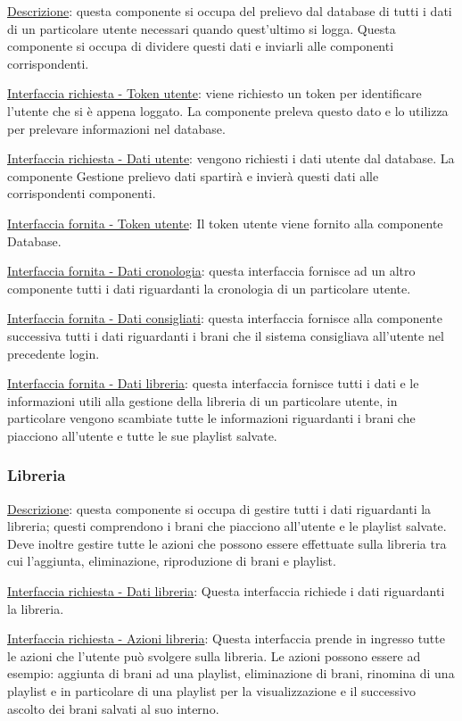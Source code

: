 \documentclass[a4paper,12pt]{article}
\begin{document}
\underline{Descrizione}: questa componente si occupa del prelievo dal database di tutti i dati di un particolare utente necessari quando quest’ultimo si logga. Questa componente si occupa di dividere questi dati e inviarli alle componenti corrispondenti.

\underline{Interfaccia richiesta - Token utente}: viene richiesto un token per identificare l’utente che si è appena loggato.  La componente preleva questo dato e lo utilizza per prelevare informazioni nel database.

\underline{Interfaccia richiesta - Dati utente}: vengono richiesti i dati utente dal database. La componente Gestione prelievo dati spartirà e invierà questi dati alle corrispondenti componenti.

\underline{Interfaccia fornita - Token utente}: Il token utente viene fornito alla componente Database.

\underline{Interfaccia fornita - Dati cronologia}: questa interfaccia fornisce ad un altro componente tutti i dati riguardanti la cronologia di un particolare utente.

\underline{Interfaccia fornita - Dati consigliati}: questa interfaccia fornisce alla componente successiva tutti i dati riguardanti i brani che il sistema consigliava all’utente nel precedente login.  

\underline{Interfaccia fornita - Dati libreria}: questa interfaccia fornisce tutti i dati e le informazioni utili alla gestione della libreria di un particolare utente, in particolare vengono scambiate tutte le informazioni riguardanti i brani che piacciono all’utente e tutte le sue playlist salvate.

\subsubsection{Libreria}

\underline{Descrizione}: questa componente si occupa di gestire tutti i dati riguardanti la libreria; questi comprendono i brani che piacciono all’utente e le playlist salvate. Deve inoltre gestire tutte le azioni che possono essere effettuate sulla libreria tra cui l’aggiunta, eliminazione, riproduzione di brani e playlist.

\underline{Interfaccia richiesta - Dati libreria}: Questa interfaccia richiede i dati riguardanti la libreria.

\underline{Interfaccia richiesta - Azioni libreria}: Questa interfaccia prende in ingresso tutte le azioni che l’utente può svolgere sulla libreria. Le azioni possono essere ad esempio: aggiunta di brani ad una playlist, eliminazione di brani, rinomina di una playlist e in particolare di una playlist per la visualizzazione e il successivo ascolto dei brani salvati al suo interno.
\end{document}
